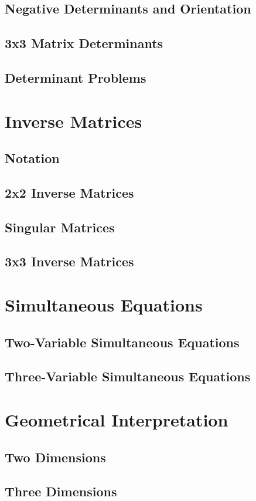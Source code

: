 \documentclass[../maths.tex]{subfiles}
\begin{document}
\subsection*{Negative Determinants and Orientation}
\subsection*{3x3 Matrix Determinants}
\subsection*{Determinant Problems}
\section{Inverse Matrices}
\subsection*{Notation}
\subsection*{2x2 Inverse Matrices}
\subsection*{Singular Matrices}
\subsection*{3x3 Inverse Matrices}
\section{Simultaneous Equations}
\subsection*{Two-Variable Simultaneous Equations}
\subsection*{Three-Variable Simultaneous Equations}
\section{Geometrical Interpretation}
\subsection*{Two Dimensions}
\subsection*{Three Dimensions}
\end{document}
